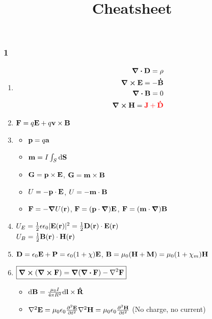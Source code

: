 \documentclass{article}
\theoremstyle{remark}
\begin{document}
\title{Cheatsheet}
\date{}
\maketitle

\subsubsection*{1}
\begin{enumerate}
    \item \begin{align*}
        \div\vb{D}=\rho\\
        \curl\vb{E}=-\vb{\dot B}\\
        \div\vb{B}=0\\
        \curl\vb{H}=\textcolor{red}{\vb{J}+\vb{\dot D}}
    \end{align*}
    \item $\vb{F}=q\vb{E}+q\vb{v}\times\vb{B}$
    \item \begin{itemize}
        \item $\vb{p} = q\vb{a} $
        \item $\vb{m} = I\int_S\dd\vb{S}$
        \item $\vb{G} = \vb{p}\times\vb{E} $, $\vb{G} = \vb{m}\times\vb{B} $
        \item $U=-\vb{p}\cdot\vb{E}$, $U=-\vb{m}\cdot\vb{B}$
        \item $\vb{F} = -\grad U(\vb{r})$, $\vb{F} = (\vb{p}\cdot\grad)\vb{E}$, $\vb{F}=(\vb{m}\cdot\grad)\vb{B}$
    \end{itemize}
    \item $U_E = \frac{1}{2}\epsilon\epsilon_0|\vb{E}(\vb{r})|^2 = \frac{1}{2}\vb{D}(\vb{r})\cdot\vb{E}(\vb{r}) $\\
        $U_B = \frac{1}{2}\vb{B}(\vb{r})\cdot\vb{H}(\vb{r})$
    \item $\vb{D} = \epsilon_0\vb{E}+\vb{P} = \epsilon_0(1+\chi)\vb{E} $, $\vb{B}=\mu_0(\vb{H}+\vb{M})=\mu_0(1+\chi_m)\vb{H}$
    \item $\boxed{\curl(\curl\vb{F})=\grad(\div\vb{F})-\laplacian{\vb{F}}}$\begin{itemize}
            \item $\dd\vb{B} = \frac{\mu_0 I}{4\pi R^2}\dd\vb{l}\times\vb{\hat R}$
            \item $\laplacian\vb{E}=\mu_0\epsilon_0\pdv[2]{\vb{E}}{t}\\
                    \laplacian\vb{H}=\mu_0\epsilon_0\pdv[2]{\vb{H}}{t}$ (No charge, no current)\\

\end{itemize}
\end{enumerate}
\end{document}
